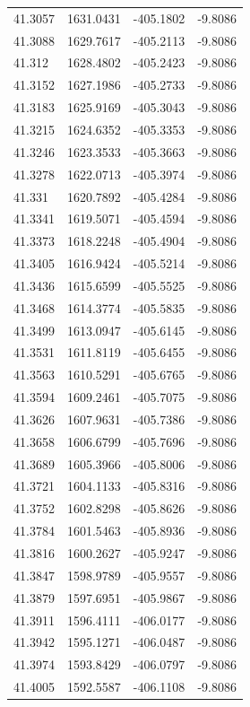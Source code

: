 \begin{table}[H]
\begin{tabular}{llll}
41.3057 & 1631.0431 & -405.1802 & -9.8086 \\
41.3088 & 1629.7617 & -405.2113 & -9.8086 \\
41.312 & 1628.4802 & -405.2423 & -9.8086 \\
41.3152 & 1627.1986 & -405.2733 & -9.8086 \\
41.3183 & 1625.9169 & -405.3043 & -9.8086 \\
41.3215 & 1624.6352 & -405.3353 & -9.8086 \\
41.3246 & 1623.3533 & -405.3663 & -9.8086 \\
41.3278 & 1622.0713 & -405.3974 & -9.8086 \\
41.331 & 1620.7892 & -405.4284 & -9.8086 \\
41.3341 & 1619.5071 & -405.4594 & -9.8086 \\
41.3373 & 1618.2248 & -405.4904 & -9.8086 \\
41.3405 & 1616.9424 & -405.5214 & -9.8086 \\
41.3436 & 1615.6599 & -405.5525 & -9.8086 \\
41.3468 & 1614.3774 & -405.5835 & -9.8086 \\
41.3499 & 1613.0947 & -405.6145 & -9.8086 \\
41.3531 & 1611.8119 & -405.6455 & -9.8086 \\
41.3563 & 1610.5291 & -405.6765 & -9.8086 \\
41.3594 & 1609.2461 & -405.7075 & -9.8086 \\
41.3626 & 1607.9631 & -405.7386 & -9.8086 \\
41.3658 & 1606.6799 & -405.7696 & -9.8086 \\
41.3689 & 1605.3966 & -405.8006 & -9.8086 \\
41.3721 & 1604.1133 & -405.8316 & -9.8086 \\
41.3752 & 1602.8298 & -405.8626 & -9.8086 \\
41.3784 & 1601.5463 & -405.8936 & -9.8086 \\
41.3816 & 1600.2627 & -405.9247 & -9.8086 \\
41.3847 & 1598.9789 & -405.9557 & -9.8086 \\
41.3879 & 1597.6951 & -405.9867 & -9.8086 \\
41.3911 & 1596.4111 & -406.0177 & -9.8086 \\
41.3942 & 1595.1271 & -406.0487 & -9.8086 \\
41.3974 & 1593.8429 & -406.0797 & -9.8086 \\
41.4005 & 1592.5587 & -406.1108 & -9.8086 \\

\end{tabular}
\end{table}

